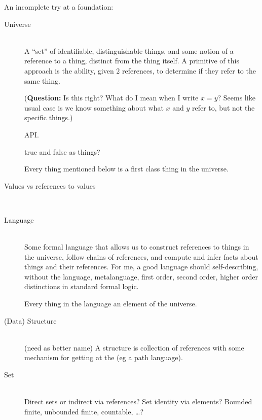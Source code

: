 \documentclass[11pt,openany]{article}
\begin{document}
An incomplete try at a foundation:
\begin{description}

\item[Universe]\mbox{}\\
A ``set'' of identifiable, distinguishable
things,
and some notion of a reference to a thing, distinct from the thing
itself.
A primitive of this approach is the ability, given $2$ references,
to determine if they refer to the same thing.
\par
(\textbf{Question:}
Is this right? What do I mean when I write $x=y$?
Seems like usual case is we know something about what $x$ and $y$
refer to, but not the specific things.)
\par
API. 
\par
\textsf{true} and \textsf{false} as things?
\par
Every thing mentioned below is a first class thing in the universe.

\item[Values vs references to values]\mbox{}\\

\item[Language]\mbox{}\\
Some formal language that allows us 
to construct references to things in the universe, 
follow chains of references, and compute and infer facts 
about things and their references. 
For me, a good language should self-describing, without the
language, metalanguage, first order, second order, higher order 
distinctions in standard formal logic.
\par
Every thing in the language an element of the universe.

\item[(Data) Structure]\mbox{}\\
(need as better name)
A structure is collection of references with
some mechanism for getting at the (eg a path language).

\item[Set]  \mbox{}\\
Direct sets or indirect via references?
Set identity via elements?
Bounded finite, unbounded finite, countable, \ldots ?


\end{description}
\end{document}
